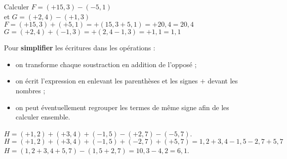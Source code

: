 \begin{exemple}
   Calculer $F =(+15,3)-(-5,1)$ \\
   et $G =(+2,4)-(+1,3)$
   \correction 
      $F =(+15,3)+(+5,1) =+(15,3+5,1) =+20,4 =20,4$ \\
      $G =(+2,4)+(-1,3) =+(2,4-1,3) =+1,1 =1,1$
\end{exemple}

\smallskip

\begin{methode*1}
   Pour {\bf simplifier} les écritures dans les opérations :
   \begin{itemize}
      \item on transforme chaque soustraction en addition de l'opposé ;
      \item on écrit l'expression en enlevant les parenthèses et les signes $+$ devant les nombres ;
      \item on peut éventuellement regrouper les termes de même signe afin de les calculer ensemble.
   \end{itemize}
   \exercice
   $H =(+1,2)+(+3,4)+(-1,5)-(+2,7)-(-5,7)$.
   \correction
   $H =(+1,2)+(+3,4)+(-1,5)+(-2,7)+(+5,7) =1,2+3,4-1,5-2,7+5,7$ \\
   $H =(1,2+3,4+5,7)-(1,5+2,7) =10,3-4,2 =6,1$.
\end{methode*1}


\exercicesbase


